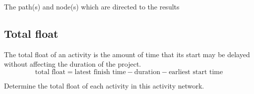 \documentclass[a4paper]{article}
\begin{document}
\begin{defi}
	The path(s) and node(s) which are directed to the results
\end{defi}

\subsection{Total float}
\begin{defi}
	The total float of an activity is the amount of time that its start may be delayed without affecting the duration of the project.
	\[
		\text{total float}=\text{latest finish time}-\text{duration}-\text{earliest start time}
	\]
\end{defi}
\begin{eg}
	Determine the total float of each activity in this activity network.


\end{eg}
\end{document}
